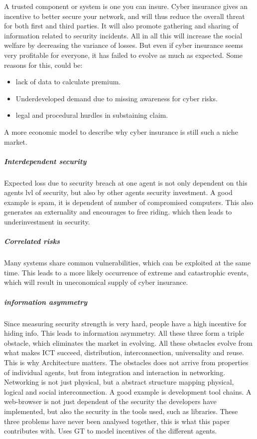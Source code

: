 \cite{bohme2010modeling}
A trusted component or system is one you can insure.
Cyber insurance gives an incentive to better secure your network, and will thus reduce the overall threat for both first and third parties. It will also promote gathering and sharing of information related to security incidents. All in all this will increase the social welfare by decreasing the variance of losses. 
But even if cyber insurance seems very profitable for everyone, it has failed to evolve as much as expected.
Some reasons for this, could be:
\begin{itemize}[topsep=-1em,parsep=0em,itemsep=0em] 
 \item lack of data to calculate premium. \item Underdeveloped demand due to missing awareness for cyber risks. \item legal and procedural hurdles in substaining claim.
\end{itemize}
A more economic model to describe why cyber insurance is still such a niche market.
\subparagraph{Interdependent security}
Expected loss due to security breach at one agent is not only dependent on this agents lvl of security,
 but also by other agents security investment. A good example is spam, it is dependent of number of compromised
  computers. This also generates an externality and encourages to free riding. which then leads to
   underinvestment in security.
\subparagraph{Correlated risks}
Many systems share common vulnerabilities, which can be exploited at the same time. 
This leads to a more likely occurrence of extreme and catastrophic events,
 which will result in uneconomical supply of cyber insurance.
\subparagraph{information asymmetry}
Since measuring security strength is very hard, 
people have a high incentive for hiding info. This leads to information asymmetry. 
All these three form a triple obstacle, which eliminates the market in evolving. 
All these obstacles evolve from what makes ICT succeed, distribution, interconnection, universality and reuse.
This is why Architecture matters. The obstacles does not arrive from properties of individual agents, 
but from integration and interaction in networking. Networking is not just physical, 
but a abstract structure mapping physical, logical and social interconnection.
 A good example is development tool chains.
  A web-browser is not just dependent of the security the developers have implemented, 
  but also the security in the tools used, such as libraries.
These three problems have never been analysed together, this is what this paper contributes with. 
Uses GT to model incentives of the different agents. 
